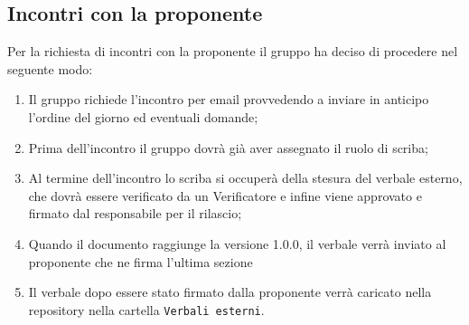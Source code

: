 \subsection{Incontri con la proponente}
Per la richiesta di incontri con la proponente il gruppo ha deciso di procedere nel seguente modo:
\begin{enumerate}
	\item Il gruppo richiede l'incontro per email provvedendo a inviare in anticipo l'ordine del giorno ed eventuali domande;
	\item Prima dell'incontro il gruppo dovrà già aver assegnato il ruolo di scriba;
	\item Al termine dell'incontro lo scriba si occuperà della stesura del verbale esterno, che dovrà essere verificato da un Verificatore e infine viene approvato e firmato dal responsabile per il rilascio;
	\item Quando il documento raggiunge la versione 1.0.0, il verbale verrà inviato al proponente che ne firma l'ultima sezione
	\item Il verbale dopo essere stato firmato dalla proponente verrà caricato nella repository nella cartella \texttt{Verbali esterni}.
\end{enumerate}